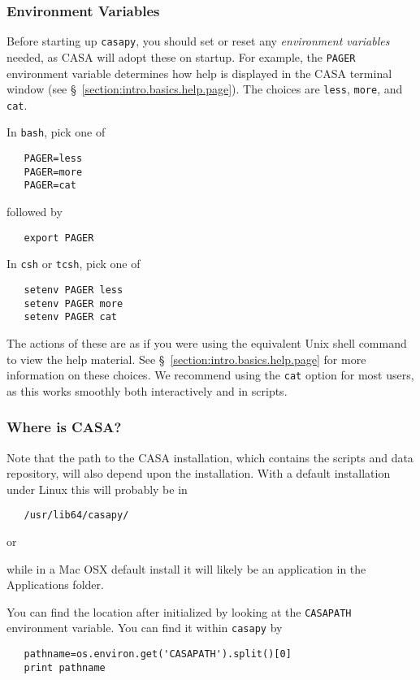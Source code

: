 \subsubsection{Environment Variables}
\label{section:intro.basics.before.env}

Before starting up {\tt casapy}, you should set or reset any
{\it environment variables} needed, as CASA will adopt these on startup.  For
example, the {\tt PAGER} environment variable determines how help is
displayed in the CASA terminal window (see
\S~\ref{section:intro.basics.help.page}).  The choices are {\tt less},
{\tt more}, and {\tt cat}.

In {\tt bash}, pick one of
\small
\begin{verbatim}
   PAGER=less
   PAGER=more
   PAGER=cat
\end{verbatim}
\normalsize
followed by
\small
\begin{verbatim}
   export PAGER
\end{verbatim}
\normalsize

In {\tt csh} or {\tt tcsh}, pick one of
\small
\begin{verbatim}
   setenv PAGER less
   setenv PAGER more
   setenv PAGER cat
\end{verbatim}
\normalsize
The actions of these are as if you were using the equivalent Unix
shell command to view the help material.  See
\S~\ref{section:intro.basics.help.page} for more information on these
choices.
We recommend using the {\tt cat} option for most users, as this works
smoothly both interactively and in scripts.

\subsubsection{Where is CASA?}
\label{section:intro.basics.before.path}

Note that the path to the CASA installation, which contains
the scripts and data repository, will also depend upon the 
installation.  With a default installation under Linux this
will probably be in
\small
\begin{verbatim}
   /usr/lib64/casapy/
\end{verbatim}
\normalsize
or 

while in a Mac OSX default install it will likely be an 
application in the Applications folder.

You can find the location after initialized by looking at
the {\tt CASAPATH} environment variable.  You can find
it within {\tt casapy} by
\small
\begin{verbatim}
   pathname=os.environ.get('CASAPATH').split()[0]
   print pathname
\end{verbatim}
\normalsize

